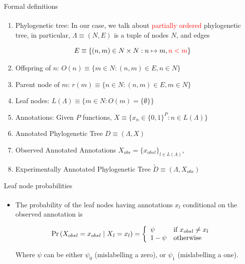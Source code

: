\documentclass[9pt,ignorenonframetext,]{beamer}
\newcommand{\Prcond}[2]{{\mbox{Pr}\left(#1\vphantom{#2}\;\right|\left.\vphantom{#1}#2\right)}}
\newcommand{\phylo}{\Lambda{}} %
\newcommand{\aphylo}{D{}}      %
\newcommand{\aphyloObs}{\tilde \aphylo{}} %
\newcommand{\Ann}{X{}} %
\newcommand{\ann}{x{}} %
\newcommand{\AnnObs}{{X_{obs}}{}}%
\newcommand{\annObs}{{x_{obs}}{}}%
\newcommand{\Leaf}{L{}}
\begin{document}
\begin{frame}[t,label=formaldef]{Formal definitions}

\framesubtitle{\hyperlink{definitions}{}}

\begin{enumerate}
\def\labelenumi{\arabic{enumi}.}
\item
  Phylogenetic tree: In our case, we talk about
  \textcolor{red}{partially ordered} phylogenetic tree, in particular,
  \(\phylo\equiv (N,E)\) is a tuple of nodes \(N\), and edges

  \[
  E\equiv \{(n, m) \in N\times N: n\mapsto m, \textcolor{red}{n < m}\}
  \]
\item
  Offspring of \(n\): \(O(n)\equiv\{m\in N: (n, m) \in E, n\in N\}\)
\item
  Parent node of \(m\): \(r(m) \equiv\{n \in N: (n, m) \in E, m\in N\}\)
\item
  Leaf nodes: \(\Leaf(\phylo)\equiv \{m \in N: O(m)=\{\emptyset\}\}\)
\item
  Annotations: Given \(P\) functions,
  \(\Ann \equiv \{\ann_n \in \{0,1\}^P: n\in \Leaf(\phylo)\}\)
\item
  Annotated Phylogenetic Tree \(\aphylo \equiv(\phylo, \Ann)\)
\item
  Observed Annotated Annotations
  \(\AnnObs = \{\annObs_l\}_{l\in \Leaf(\phylo)}\),
\item
  Experimentally Annotated Phylogenetic Tree
  \(\aphyloObs\equiv(\phylo, \AnnObs)\)
\end{enumerate}

\end{frame}

\begin{frame}[t,label=leafnodesprob]{Leaf node probabilities}

\framesubtitle{\hyperlink{peelingalgorithm}{}}

\begin{itemize}
\item
  The probability of the leaf nodes having annotations \(\ann_l\)
  conditional on the observed annotation is

  \begin{equation}
  \label{eq:leaf1}
  \Prcond{\AnnObs_{l} = \annObs_{l}}{\Ann_{l} = \ann_{l}} = \left\{
  \begin{array}{ll}
  \psi &\mbox{if }\annObs_{l} \neq \ann_{l} \\
  1 - \psi & \mbox{otherwise}
  \end{array}
  \right.
  \end{equation}

  Where \(\psi\) can be either \(\psi_0\) (mislabelling a zero), or
  \(\psi_1\) (mislabelling a one).
\end{itemize}

\end{frame}
\end{document}
